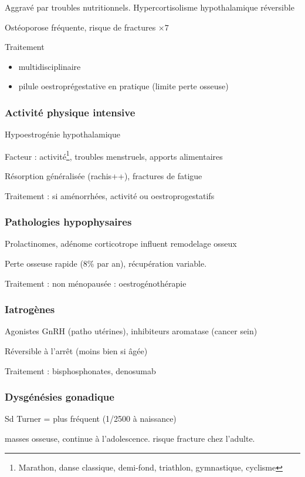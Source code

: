 \documentclass[11pt]{article}
\begin{document}
Aggravé par troubles nutritionnels. Hypercortisolisme hypothalamique réversible

Ostéoporose fréquente, risque de fractures \(\times 7\)

Traitement 
\begin{itemize}
\item multidisciplinaire
\item pilule oestroprégestative en pratique (limite perte osseuse)
\end{itemize}

\subsubsection{Activité physique intensive}
\label{sec:org7cebe46}
Hypoestrogénie hypothalamique

Facteur : activité\footnote{Marathon, danse classique, demi-fond, triathlon, gymnastique, cyclisme}, troubles menstruels, apports alimentaires

Résorption généralisée (rachis++), \inc fractures de fatigue

Traitement : si aménorrhées, \dec activité ou oestroprogestatifs

\subsubsection{Pathologies hypophysaires}
\label{sec:orgad10614}
Prolactinomes, adénome corticotrope influent remodelage osseux

Perte osseuse rapide (8\% par an), récupération variable.

Traitement : \female{} non ménopausée : oestrogénothérapie

\subsubsection{Iatrogènes}
\label{sec:org27e923f}
Agonistes GnRH (patho utérines), inhibiteurs aromatase (cancer sein)

Réversible à l'arrêt (moins bien si âgée)

Traitement : bisphosphonates, denosumab

\subsubsection{Dysgénésies gonadique}
\label{sec:orgadfd138}
Sd Turner = plus fréquent (1/2500 à naissance)

\dec masses osseuse, continue à l'adolescence. \inc risque fracture chez
l'adulte.
\end{document}
